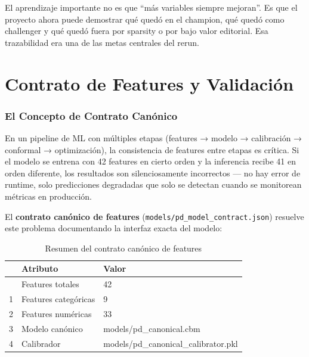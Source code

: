 \documentclass[
  spanish,
  11pt,
  letterpaper,
]{scrbook}
\theoremstyle{plain}
\theoremstyle{remark}
\begin{document}
El aprendizaje importante no es que ``más variables siempre mejoran''.
Es que el proyecto ahora puede demostrar qué quedó en el champion, qué
quedó como challenger y qué quedó fuera por sparsity o por bajo valor
editorial. Esa trazabilidad era una de las metas centrales del rerun.

\chapter{Contrato de Features y Validación}\label{sec-feature-contract}

\subsection{El Concepto de Contrato
Canónico}\label{el-concepto-de-contrato-canuxf3nico}

En un pipeline de ML con múltiples etapas (features → modelo →
calibración → conformal → optimización), la consistencia de features
entre etapas es crítica. Si el modelo se entrena con 42 features en
cierto orden y la inferencia recibe 41 en orden diferente, los
resultados son silenciosamente incorrectos --- no hay error de runtime,
solo predicciones degradadas que solo se detectan cuando se monitorean
métricas en producción.

El \textbf{contrato canónico de features}
(\texttt{models/pd\_model\_contract.json}) resuelve este problema
documentando la interfaz exacta del modelo:

{

\begin{longtable}[]{@{}lll@{}}

\caption{\label{tbl-contract-summary}Resumen del contrato canónico de
features}

\tabularnewline

\toprule\noalign{}
& Atributo & Valor \\
\midrule\noalign{}
\endhead
\bottomrule\noalign{}
\endlastfoot
0 & Features totales & 42 \\
1 & Features categóricas & 9 \\
2 & Features numéricas & 33 \\
3 & Modelo canónico & models/pd\_canonical.cbm \\
4 & Calibrador & models/pd\_canonical\_calibrator.pkl \\

\end{longtable}

}
\end{document}
